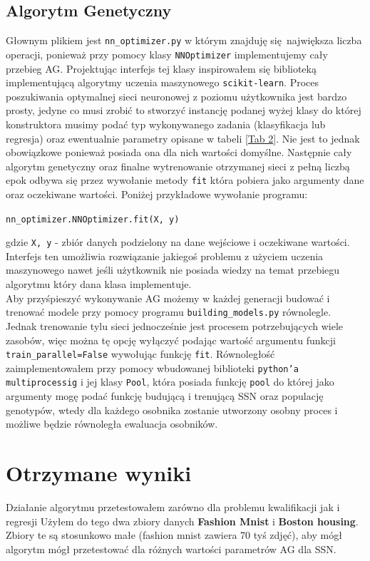 \documentclass{article}
\begin{document}
\subsection{Algorytm Genetyczny}
Głownym plikiem jest \texttt{nn\_optimizer.py} w którym znajduję się największa liczba operacji,
ponieważ przy pomocy klasy \texttt{NNOptimizer} implementujemy cały przebieg AG.
Projektując interfejs tej klasy inspirowałem się biblioteką implementującą
algorytmy uczenia maszynowego \texttt{scikit-learn}. Proces poszukiwania
optymalnej sieci neuronowej z poziomu użytkownika jest bardzo prosty, jedyne co musi zrobić
to stworzyć instancję podanej wyżej klasy do której konstruktora musimy podać typ wykonywanego
zadania (klasyfikacja lub regresja) oraz ewentualnie parametry opisane w tabeli 
[\hyperref[tab:params]{Tab 2}]. Nie jest to jednak obowiązkowe ponieważ posiada ona dla nich
wartości domyślne.
Następnie cały algorytm genetyczny oraz finalne wytrenowanie otrzymanej sieci z pełną
liczbą epok odbywa się przez wywołanie metody \texttt{fit} która pobiera jako argumenty
dane oraz oczekiwane wartości. Poniżej przykładowe wywołanie programu:\\
\begin{center}
	\texttt{nn\_optimizer.NNOptimizer.fit(X, y)}\\
\end{center}
gdzie \texttt{X, y} - zbiór danych podzielony na dane wejściowe i oczekiwane wartości.\\
Interfejs ten umożliwia rozwiązanie jakiegoś problemu z użyciem uczenia maszynowego
nawet jeśli użytkownik nie posiada wiedzy na temat przebiegu algorytmu który dana klasa 
implementuje.\\
\newline
Aby przyśpieszyć wykonywanie AG możemy w każdej generacji budować i trenować 
modele przy pomocy programu \texttt{building\_models.py} równolegle. Jednak trenowanie tylu
sieci jednocześnie jest procesem potrzebujących wiele zasobów, więc można tę opcję wyłączyć
podając wartość argumentu funkcji \texttt{train\_parallel=False} wywołując funkcję 
\texttt{fit}.
Równoległość zaimplementowałem przy pomocy wbudowanej biblioteki \texttt{python'a}
\texttt{multiprocessig} i jej klasy \texttt{Pool}, która posiada
funkcję \texttt{pool} do której jako argumenty mogę podać funkcję budującą i trenującą 
SSN oraz populację genotypów, wtedy dla każdego osobnika zostanie utworzony osobny proces
i możliwe będzie równoległa ewaluacja osobników.


\section{Otrzymane wyniki}
Działanie algorytmu przetestowałem zarówno dla problemu kwalifikacji jak i  regresji
Użyłem do tego dwa zbiory danych \textbf{Fashion Mnist} i \textbf{Boston housing}. 
Zbiory te są stosunkowo małe (fashion mnist zawiera 70 tyś zdjęć), aby mógł algorytm 
mógł przetestować dla różnych wartości parametrów AG dla SSN.
\end{document}
